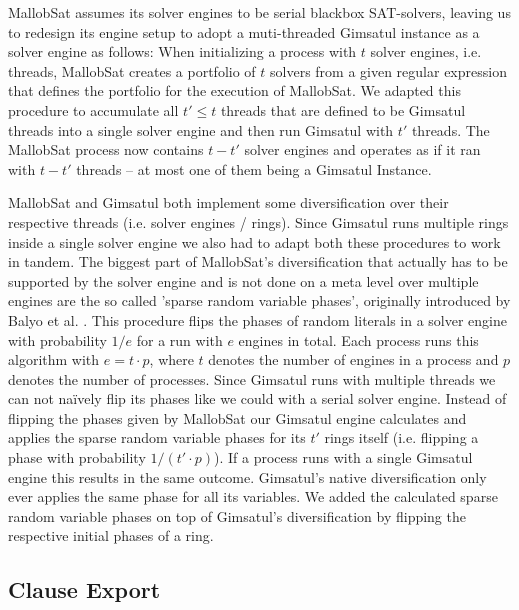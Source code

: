 \documentclass[12pt,a4paper,twoside]{scrartcl}
\numberwithin{equation}{section}
\begin{document}
MallobSat assumes its solver engines to be serial blackbox SAT-solvers, leaving us to redesign its engine setup to adopt a muti-threaded Gimsatul instance as a solver engine as follows: 
When initializing a process with $t$ solver engines, i.e. threads, MallobSat creates a portfolio of $t$ solvers from a given regular expression that defines the portfolio for the execution of MallobSat. We adapted this procedure to accumulate all $t' \leq t$ threads that are defined to be Gimsatul threads into a single solver engine and then run Gimsatul with $t'$ threads. The MallobSat process now contains $t - t'$ solver engines and operates as if it ran with $t - t'$ threads -- at most one of them being a Gimsatul Instance.

MallobSat and Gimsatul both implement some diversification over their respective threads (i.e. solver engines / rings). Since Gimsatul runs multiple rings inside a single solver engine we also had to adapt both these procedures to work in tandem.
The biggest part of MallobSat's diversification that actually has to be supported by the solver engine and is not done on a meta level over multiple engines are the so called 'sparse random variable phases', originally introduced by Balyo et al. \cite{hordeSat}. This procedure flips the phases of random literals in a solver engine with probability $1 / e$ for a run with $e$ engines in total. Each process runs this algorithm with $e = t \cdot p$, where $t$ denotes the number of engines in a process and $p$ denotes the number of processes. Since Gimsatul runs with multiple threads we can not na\"ively flip its phases like we could with a serial solver engine. Instead of flipping the phases given by MallobSat our Gimsatul engine calculates and applies the sparse random variable phases for its $t'$ rings itself (i.e. flipping a phase with probability $1 / (t' \cdot p)$). If a process runs with a single Gimsatul engine this results in the same outcome.
Gimsatul's native diversification only ever applies the same phase for all its variables. We added the calculated sparse random variable phases on top of Gimsatul's diversification by flipping the respective initial phases of a ring.

\subsection{Clause Export}
\end{document}
